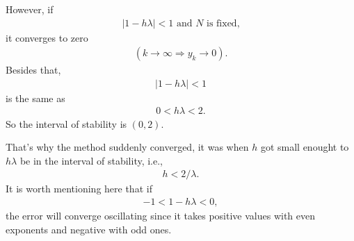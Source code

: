 \documentclass[letterpaper,10pt,english]{jupyterBook}
\begin{document}
\sphinxAtStartPar
However, if
\begin{equation*}
\begin{split}
    |1 - h \lambda| < 1 \text{ and } N \text{ is fixed,}
\end{split}
\end{equation*}
\sphinxAtStartPar
it converges to zero
\begin{equation*}
\begin{split}
    (k \rightarrow \infty \Rightarrow y_k \rightarrow 0 ).
\end{split}
\end{equation*}
\sphinxAtStartPar
Besides that,
\begin{equation*}
\begin{split}
|1 - h \lambda| < 1
\end{split}
\end{equation*}
\sphinxAtStartPar
is the same as
\begin{equation*}
\begin{split}
0 < h \lambda < 2.
\end{split}
\end{equation*}
\sphinxAtStartPar
So the interval of stability is \((0,2)\).

\sphinxAtStartPar
That’s why the method suddenly converged, it was when \(h\) got small enought to \(h \lambda\) be in the interval of stability, i.e.,
\begin{equation*}
\begin{split}
    h < 2/\lambda.
\end{split}
\end{equation*}
\sphinxAtStartPar
It is worth mentioning here that if
\begin{equation*}
\begin{split}
-1 < 1 - h \lambda < 0,
\end{split}
\end{equation*}
\sphinxAtStartPar
the error will converge oscillating since it takes positive values with even exponents and negative with odd ones.
\end{document}
